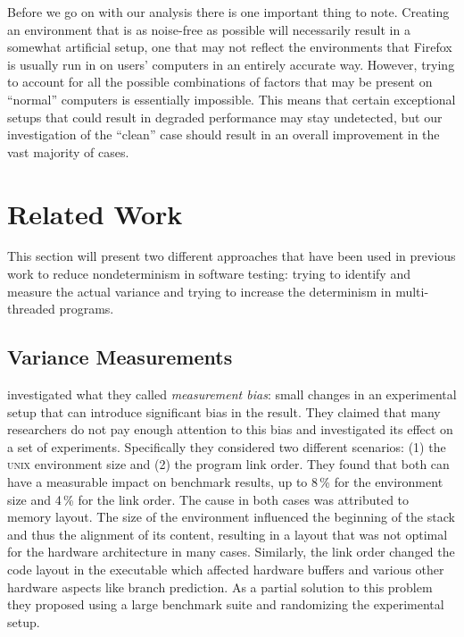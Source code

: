 Before we go on with our analysis there is one important thing to note.
Creating an environment that is as noise-free as possible will necessarily
result in a somewhat artificial setup, one that may not reflect the
environments that Firefox is usually run in on users' computers in an entirely
accurate way. However, trying to account for all the possible combinations of
factors that may be present on ``normal'' computers is essentially impossible.
This means that certain exceptional setups that could result in degraded
performance may stay undetected, but our investigation of the ``clean'' case
should result in an overall improvement in the vast majority of cases.

\section{Related Work} %
\label{sec:bg:related}

This section will present two different approaches that have been used in
previous work to reduce nondeterminism in software testing: trying to identify
and measure the actual variance and trying to increase the determinism in
multi-threaded programs.

\subsection{Variance Measurements} %
\label{sec:bg:relvar}

\citet{mytkowicz_producing_2009} investigated what they called
\emph{measurement bias}: small changes in an experimental setup that can
introduce significant bias in the result. They claimed that many researchers
do not pay enough attention to this bias and investigated its effect on a set
of experiments. Specifically they considered two different scenarios: (1) the
\textsc{unix} environment size and (2) the program link order. They found that
both can have a measurable impact on benchmark results, up to 8\,\% for the
environment size and 4\,\% for the link order. The cause in both cases was
attributed to memory layout. The size of the environment influenced the
beginning of the stack and thus the alignment of its content, resulting in a
layout that was not optimal for the hardware architecture in many cases.
Similarly, the link order changed the code layout in the executable which
affected hardware buffers and various other hardware aspects like branch
prediction. As a partial solution to this problem they proposed using a large
benchmark suite and randomizing the experimental setup.


